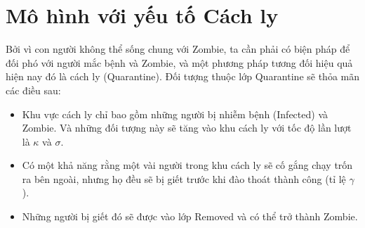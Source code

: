 \documentclass[12pt]{scrartcl}
\begin{document}
\section{Mô hình với yếu tố Cách ly}
Bởi vì con người không thể sống chung với Zombie, ta cần phải có biện pháp để đối phó với người mắc bệnh và Zombie, và một phương pháp tương đối hiệu quả hiện nay đó là cách ly (Quarantine). Đối tượng thuộc lớp Quarantine sẽ thỏa mãn các điều sau:
\begin{itemize}
\item Khu vực cách ly chỉ bao gồm những người bị nhiễm bệnh (Infected) và Zombie. Và những đối tượng này sẽ tăng vào khu cách ly với tốc độ lần lượt là $\kappa$ và $\sigma$.
\item Có một khả năng rằng một vài người trong khu cách ly sẽ cố gắng chạy trốn ra bên ngoài, nhưng họ đều sẽ bị giết trước khi đào thoát thành công (tỉ lệ $\gamma$).
\item Những người bị giết đó sẽ được vào lớp Removed và có thể trở thành Zombie.
\end{itemize}
\end{document}
